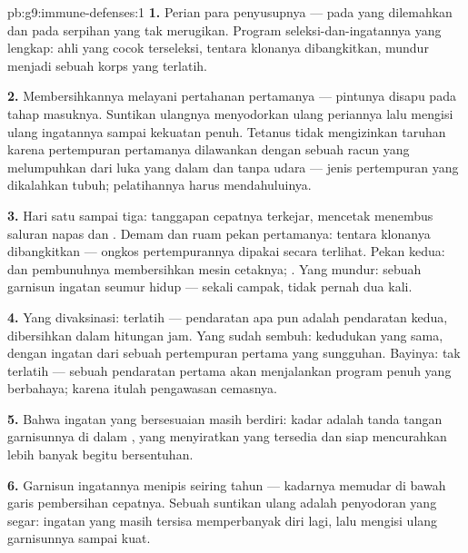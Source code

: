 \begin{solution}{pb:g9:immune-defenses:1}
\textbf{1.} Perian para penyusupnya ---  pada 
yang dilemahkan dan pada serpihan yang tak merugikan.
Program seleksi-dan-ingatannya yang lengkap: ahli yang cocok
terseleksi, tentara klonanya dibangkitkan, 
mundur menjadi sebuah korps yang terlatih.

\textbf{2.} Membersihkannya melayani pertahanan pertamanya
--- pintunya disapu pada tahap masuknya. Suntikan ulangnya
menyodorkan ulang periannya lalu mengisi ulang ingatannya
sampai kekuatan penuh. Tetanus tidak mengizinkan taruhan
karena pertempuran pertamanya dilawankan dengan sebuah racun
yang melumpuhkan dari luka yang dalam dan tanpa udara ---
jenis pertempuran yang dikalahkan tubuh; pelatihannya harus
mendahuluinya.

\textbf{3.} Hari satu sampai tiga: tanggapan cepatnya
terkejar,  mencetak menembus saluran napas dan
. Demam dan ruam pekan pertamanya: tentara klonanya
dibangkitkan --- ongkos pertempurannya dipakai secara
terlihat. Pekan kedua:  dan pembunuhnya membersihkan
mesin cetaknya; . Yang mundur: sebuah garnisun
ingatan seumur hidup --- sekali campak, tidak pernah dua kali.

\textbf{4.} Yang divaksinasi: terlatih --- pendaratan apa pun
adalah pendaratan kedua, dibersihkan dalam hitungan jam.
Yang sudah sembuh: kedudukan yang sama, dengan ingatan dari
sebuah pertempuran pertama yang sungguhan. Bayinya: tak
terlatih --- sebuah pendaratan pertama akan menjalankan
program penuh yang berbahaya; karena itulah pengawasan
cemasnya.

\textbf{5.} Bahwa ingatan yang bersesuaian masih berdiri:
kadar  adalah tanda tangan garnisunnya di dalam
, yang menyiratkan  yang tersedia dan siap
mencurahkan lebih banyak begitu bersentuhan.

\textbf{6.} Garnisun ingatannya menipis seiring tahun ---
kadarnya memudar di bawah garis pembersihan cepatnya. Sebuah
suntikan ulang adalah penyodoran yang segar: ingatan yang
masih tersisa memperbanyak diri lagi, lalu mengisi ulang
garnisunnya sampai kuat.


\end{solution}
